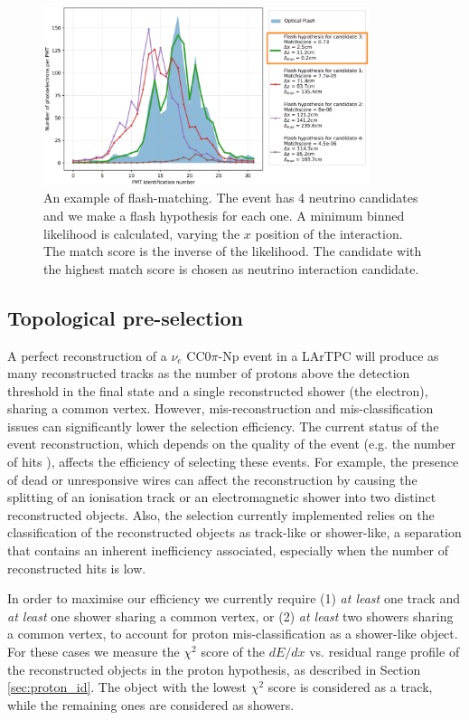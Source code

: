 \begin{figure}[htbp]
\centering
\includegraphics[width=0.85\textwidth]{figures/flashmatch.png} 
\caption{An example of flash-matching. The event has 4 neutrino candidates and we make a flash hypothesis for each one. A minimum binned likelihood is calculated, varying the $x$ position of the interaction. The match score is the inverse of the likelihood. The candidate with the highest match score is chosen as neutrino interaction candidate.} 
\label{fig:flashmatch}
\end{figure}

\subsection{Topological pre-selection} \label{sec:topological_pre_selection}
A perfect reconstruction of a $\nu_{e}$ CC0$\pi$-Np event in a LArTPC will produce as many reconstructed tracks as the number of protons above the detection threshold in the final state and a single reconstructed shower (the electron), sharing a common vertex. However, mis-reconstruction and mis-classification issues can significantly lower the selection efficiency. The current status of the event reconstruction, which depends on the quality of the event (e.g. the number of hits \cite{Acciarri:2017hat}), affects the efficiency of selecting these events. For example, the presence of dead or unresponsive wires can affect the reconstruction by causing the splitting of an ionisation track or an electromagnetic shower into two distinct reconstructed objects. Also, the selection currently implemented relies on the classification of the reconstructed objects as track-like or shower-like, a separation that contains an inherent inefficiency associated, especially when the number of reconstructed hits is low.

In order to maximise our efficiency we currently require (1) \emph{at least} one track and \emph{at least} one shower sharing a common vertex, or (2) \emph{at least} two showers sharing a common vertex, to account for proton mis-classification as a shower-like object. For these cases we measure the $\chi^2$ score of the $dE/dx$ vs. residual range profile of the reconstructed objects in the proton hypothesis, as described in Section \ref{sec:proton_id}. The object with the lowest $\chi^2$ score is considered as a track, while the remaining ones are considered as showers.

